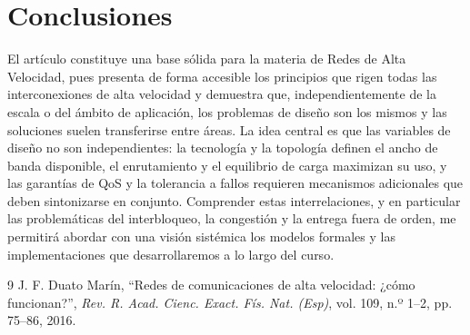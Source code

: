 \documentclass[12pt,a4paper]{article}
\begin{document}
\section{Conclusiones}

El artículo constituye una base sólida para la materia de Redes de Alta Velocidad, pues presenta de forma accesible los principios que rigen todas las interconexiones de alta velocidad y demuestra que, independientemente de la escala o del ámbito de aplicación, los problemas de diseño son los mismos y las soluciones suelen transferirse entre áreas. La idea central es que las variables de diseño no son independientes: la tecnología y la topología definen el ancho de banda disponible, el enrutamiento y el equilibrio de carga maximizan su uso, y las garantías de QoS y la tolerancia a fallos requieren mecanismos adicionales que deben sintonizarse en conjunto. Comprender estas interrelaciones, y en particular las problemáticas del interbloqueo, la congestión y la entrega fuera de orden, me permitirá abordar con una visión sistémica los modelos formales y las implementaciones que desarrollaremos a lo largo del curso.

\begin{thebibliography}{9}
    J. F. Duato Marín, ``Redes de comunicaciones de alta velocidad: ¿cómo funcionan?'', \textit{Rev. R. Acad. Cienc. Exact. Fís. Nat. (Esp)}, vol. 109, n.º 1--2, pp. 75--86, 2016.
\end{thebibliography}
\end{document}
